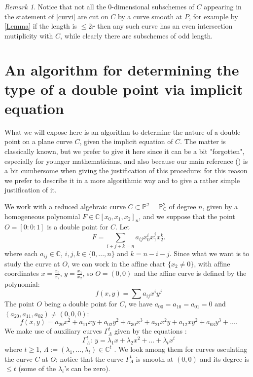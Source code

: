\documentclass[draft]{amsart}
\theoremstyle{definition}
\theoremstyle{remark}
\newtheorem{rem}[thm]{Remark}
\theoremstyle{definition}
\newcommand{\PP}{\mathbb{P}}
\def\a{\bigskip \par \noindent}
\def\l{\lambda}
\begin{document}
\begin{rem} \rm Notice that not all the 0-dimensional subschemes of $C$ appearing in the statement of \ref{curvi} are cut on $C$ by a curve smooth at $P$, for example by \ref{Lemma} if the length is $\leq 2r$ then any such curve has an even intersection mutiplicity with $C$, while clearly there are subschemes of odd length.
\end{rem}


\a 
\section{An algorithm for determining the type of a double point via implicit equation}

What we will expose here is an algorithm to determine the nature of a double point on a plane curve $C$, given the implicit equation of $C$. The matter is classically known, but we prefer to give it here since it can be a bit "forgotten", especially for younger mathematicians, and also because our main reference (\cite{C}) is a bit cumbersome when giving the justification of this procedure: for this reason we prefer to describe it in a more algorithmic way and to give a rather simple justification of it. 

\medskip


We work with a reduced algebraic curve $C\subset \PP^2=\PP^2_{\mathbb C}$ of degree $n$, given by a homogeneous polynomial  $F\in {\mathbb C}[x_0,x_1,x_2]_n$, and we suppose that the point $O = [0:0:1]$ is a double point for $C$.  Let
$$
  F = \sum _{i+j+k=n}a_{ij}x_0^ix_1^jx_2^{k} .
$$
where each $a_{ij}\in {\mathbb C}$, $i,j,k\in \{0,...,n\}$ and $k=n-i-j$.
\medskip
Since what we want is to study the curve at $O$, we can work in the affine chart $\{x_2\neq 0\}$, with affine coordinates $x =\frac {x_0}{x_2}$, $y=\frac{x_1}{x_2}$, so $O=(0,0)$ and the affine curve is defined by the polynomial:
$$f(x,y) = \sum a_{ij}x^iy^j  $$
The point $O$ being a double point for $C$, we have  $a_{00} = a_{10}=a_{01}= 0$ and $(a_{20}, a_{11}, a_{02}) \neq (0,0,0)$:
$$
f(x,y) = a_{20}x^2 + a_{11}xy + a_{02}y^2 + a_{30}x^3 + a_{21}x^2y + a_{12}xy^2 + a_{03}y^3 + ...     .
$$
We make use of auxiliary curves $\Gamma ^t_{\Lambda}$ given by the equations :
$$
\Gamma ^t_{{\Lambda}}:\   y={\l_1}x + {\l_2}x^2 + ... + {\l_t}x^t 
$$
where $t\geq 1$, ${\Lambda}:= (\l_1,...,\l_t) \in {\mathbb C}^t$ . We look among them for curves osculating the curve $C$ at $O$; notice that the curve $\Gamma ^t_{{\Lambda}}$ is smooth at $(0,0)$ and its degree is $\leq t$ (some of the $\l_i$'s can be zero).
\end{document}
